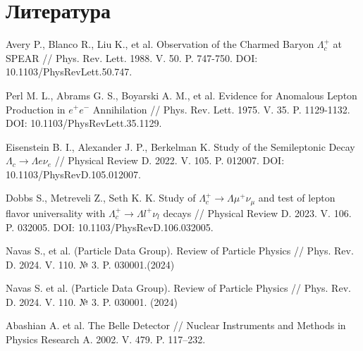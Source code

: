 \section{Литература}

\begin{thebibliography}{99}

    Avery P., Blanco R., Liu K., et al. Observation of the Charmed Baryon $\Lambda^+_c$ at SPEAR // Phys. Rev. Lett. 1988. V. 50. P. 747-750. DOI: 10.1103/PhysRevLett.50.747.
    
    Perl M. L., Abrams G. S., Boyarski A. M., et al. Evidence for Anomalous Lepton Production in $e^+e^-$ Annihilation // Phys. Rev. Lett. 1975. V. 35. P. 1129-1132. DOI: 10.1103/PhysRevLett.35.1129.
    
    Eisenstein B. I., Alexander J. P., Berkelman K. Study of the Semileptonic Decay $\Lambda_c \rightarrow \Lambda e \nu_e$ // Physical Review D. 2022. V. 105. P. 012007. DOI: 10.1103/PhysRevD.105.012007.
    
    Dobbs S., Metreveli Z., Seth K. K. Study of $\Lambda_c^+ \rightarrow \Lambda \mu^+ \nu_{\mu}$ and test of lepton flavor universality with $\Lambda_c^+ \rightarrow \Lambda l^+ \nu_l$ decays // Physical Review D. 2023. V. 106. P. 032005. DOI: 10.1103/PhysRevD.106.032005.
    
    Navas S., et al. (Particle Data Group). Review of Particle Physics // Phys. Rev. D. 2024. V. 110. $№$ 3. P. 030001.(2024)
    
    Navas S. et al. (Particle Data Group). Review of Particle Physics // Phys. Rev. D. 2024. V. 110. № 3. P. 030001. (2024)

    Abashian A. et al. The Belle Detector // Nuclear Instruments and Methods in Physics Research A. 2002. V. 479. P. 117–232.
    

\end{thebibliography}